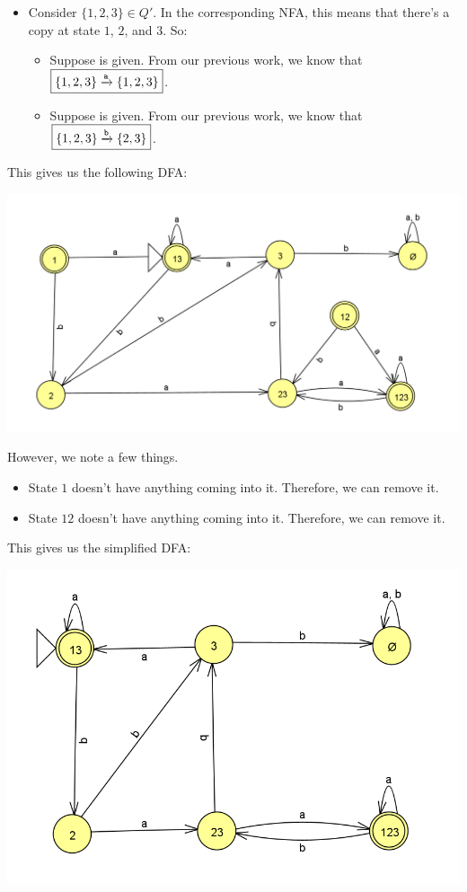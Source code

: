 \documentclass[letterpaper]{article}
\begin{document}
\begin{itemize}
    \item Consider $\{1, 2, 3\} \in Q'$. In the corresponding NFA, this means that there's a copy at state $1$, $2$, and $3$. So: 
    \begin{itemize}
        \item Suppose  is given. From our previous work, we know that $\boxed{\{1, 2, 3\} \xrightarrow{\texttt{a}} \{1, 2, 3\}}$.
        \item Suppose  is given. From our previous work, we know that $\boxed{\{1, 2, 3\} \xrightarrow{\texttt{b}} \{2, 3\}}$.
    \end{itemize}
\end{itemize}

This gives us the following DFA: 
\begin{center}
    \includegraphics[scale=0.50]{../assets/nfa_to_dfa_2.png}
\end{center}

However, we note a few things.
\begin{itemize}
    \item State $1$ doesn't have anything coming into it. Therefore, we can remove it.
    \item State $12$ doesn't have anything coming into it. Therefore, we can remove it.
\end{itemize}
This gives us the simplified DFA: 
\begin{center}
    \includegraphics[scale=0.50]{../assets/nfa_to_dfa_3.png}
\end{center}
\end{document}
